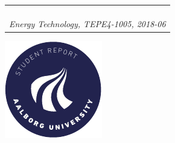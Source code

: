 \begin{titlepage}
{{\begin{tabular}{@{}p{\textwidth}@{}}
\begin{center}
{      }
    \end{center}
   \begin{center}
    {\large
      Anders Andersen, Alfred Alfredsen, Anne Annesen%
    }\\
    \vspace{0.4cm}
    {\large
      \textit{Energy Technology, TEPE4-1005, 2018-06}%
    }
   \end{center}
   \vspace{0.2cm}
  \end{tabular}}}
  \vfill
  \begin{center}
    \includegraphics[width=0.2\paperwidth]{AAUgraphics/aau_logo_circle_en}%
  \end{center}
\end{titlepage}
\clearpage
